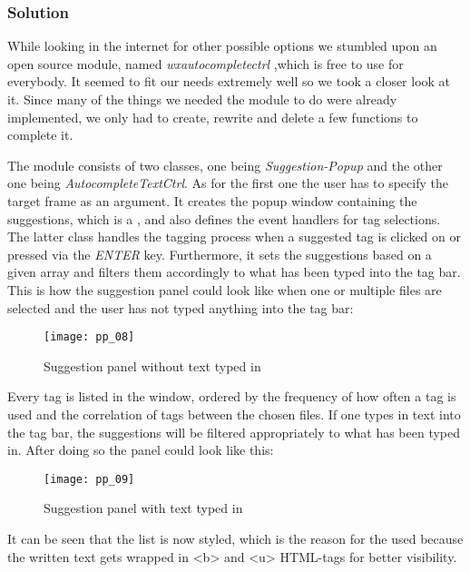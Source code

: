 \subsubsection{Solution}
While looking in the internet for other possible options we stumbled upon an open source module, named \emph{wxautocompletectrl} \cite{autocomplete},which is free to use for everybody. It seemed to fit our needs extremely well so we took a closer look at it. Since many of the things we needed the module to do were already implemented, we only had to create, rewrite and delete a few functions to complete it. 

The module consists of two classes, one being \textit{Suggestion-Popup} and the other one being \textit{AutocompleteTextCtrl}. As for the first one the user has to specify the target frame as an argument. It creates the popup window containing the suggestions, which is a  \cite{wxhtmllistbox}, and also defines the event handlers for tag selections. The latter class handles the tagging process when a suggested tag is clicked on or pressed via the \textit{ENTER} key. Furthermore, it sets the suggestions based on a given array and filters them accordingly to what has been typed into the tag bar.
This is how the suggestion panel could look like when one or multiple files are selected and the user has not typed anything into the tag bar:

\begin{figure}[H]
    \centering
    \texttt{[image: pp\_08]}
    \caption{Suggestion panel without text typed in}
\end{figure}

Every tag is listed in the window, ordered by the frequency of how often a tag is used and the correlation of tags between the chosen files. If one types in text into the tag bar, the suggestions will be filtered appropriately to what has been typed in. After doing so the panel could look like this:

\begin{figure}[H]
    \centering
    \texttt{[image: pp\_09]}
    \caption{Suggestion panel with text typed in}
\end{figure}

It can be seen that the list is now styled, which is the reason for the used  because the written text gets wrapped in <b> and <u> HTML-tags for better visibility.



